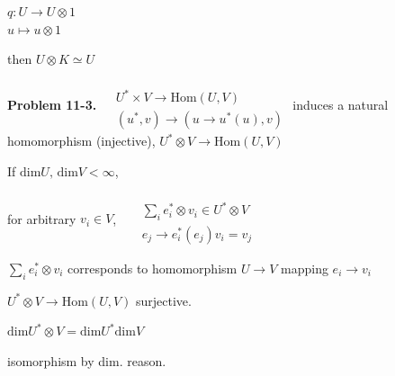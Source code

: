 \documentclass[11pt]{amsart}
\theoremstyle{definition}
\newcommand{\problemhead}[1]{\medskip\noindent\textbf{Problem #1.} }
\begin{document}
$q: U \to U\otimes 1$ \\
$u \mapsto u\otimes 1$

then $U\otimes K \simeq U$


\problemhead{11-3} $\begin{aligned} & \quad \\
  & U^* \times V \to \text{Hom}{(U,V)} \\
  & (u^*, v) \to ( u \to u^*(u), v) \end{aligned}$ induces a natural homomorphism (injective), $U^* \otimes V \to \text{Hom}{(U,V)}$

If $\text{dim}{U}, \, \text{dim}{V} < \infty$,

for arbitrary $v_i \in V$, \, $\begin{aligned} & \quad \\
  & \sum_i e_i^* \otimes v_i \in U^* \otimes V \\
  & e_j \to e_i^*(e_j)v_i = v_j \end{aligned}$

$\sum_i e_i^* \otimes v_i$ corresponds to homomorphism $U\to V$ mapping $e_i \to v_i$

$U^* \otimes V \to \text{Hom}{(U,V)}$ surjective.

$\text{dim}{U^* \otimes V} = \text{dim}{U^*} \text{dim}{V}$

isomorphism by dim. reason.
\end{document}
